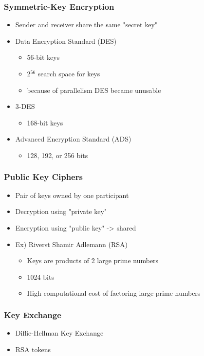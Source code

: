 \documentclass[11pt]{article}
\begin{document}
\subsubsection{Symmetric-Key Encryption}
\label{sec:orgheadline156}
\begin{itemize}
\item Sender and receiver share the same "secret key"
\item Data Encryption Standard (DES)
\begin{itemize}
\item 56-bit keys
\item 2\(^{\text{56}}\) search space for keys
\item because of parallelism DES became unusable
\end{itemize}
\item 3-DES
\begin{itemize}
\item 168-bit keys
\end{itemize}
\item Advanced Encryption Standard (ADS)
\begin{itemize}
\item 128, 192, or 256 bits
\end{itemize}
\end{itemize}

\subsubsection{Public Key Ciphers}
\label{sec:orgheadline157}
\begin{itemize}
\item Pair of keys owned by one participant
\item Decryption using "private key"
\item Encryption using "public key" -> shared
\item Ex) Riverst Shamir Adlemann (RSA)
\begin{itemize}
\item Keys are products of 2 large prime numbers
\item 1024 bits
\item High computational cost of factoring large prime numbers
\end{itemize}
\end{itemize}

\subsubsection{Key Exchange}
\label{sec:orgheadline158}
\begin{itemize}
\item Diffie-Hellman Key Exchange
\item RSA tokens
\end{itemize}
\end{document}
